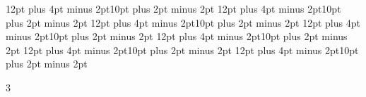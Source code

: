 \titlespacing*{\sectionA}    {\parindent}{12pt plus 4pt minus 2pt}{10pt plus 2pt minus 2pt} %
\titlespacing*{\sectionB}    {\parindent}{12pt plus 4pt minus 2pt}{10pt plus 2pt minus 2pt} %
\titlespacing*{\sectionC}    {\parindent}{12pt plus 4pt minus 2pt}{10pt plus 2pt minus 2pt} %
\titlespacing*{\sectionD}    {\parindent}{12pt plus 4pt minus 2pt}{10pt plus 2pt minus 2pt} %
\titlespacing*{\sectionE}    {\parindent}{12pt plus 4pt minus 2pt}{10pt plus 2pt minus 2pt} %
\titlespacing*{\sectionF}    {\parindent}{12pt plus 4pt minus 2pt}{10pt plus 2pt minus 2pt} %
\titlespacing*{\paragraph}   {\parindent}{12pt plus 4pt minus 2pt}{10pt plus 2pt minus 2pt} %

\def\toclevel@sectionA{1}
\def\toclevel@sectionB{2}
\def\toclevel@sectionC{3}
\def\toclevel@sectionD{4}
\def\toclevel@sectionE{5}
\def\toclevel@sectionF{6}
\def\toclevel@paragraph{7}
\def\toclevel@subparagraph{8}

\setcounter{secnumdepth}{6} %
\setcounter{tocdepth}   {3} %

\def\l@sectionA    {\@dottedtocline{1}{0em}{2em}}
\def\l@sectionB    {\@dottedtocline{2}{0em}{2em}}
\def\l@sectionC    {\@dottedtocline{3}{0em}{3em}}
\def\l@sectionD    {\@dottedtocline{4}{0em}{4em}}
\def\l@sectionE    {\@dottedtocline{5}{0em}{5em}}
\def\l@sectionF    {\@dottedtocline{6}{0em}{6em}}
\def\l@paragraph   {\@dottedtocline{7}{0em}{7em}}
\def\l@subparagraph{\@dottedtocline{8}{0em}{7em}}



